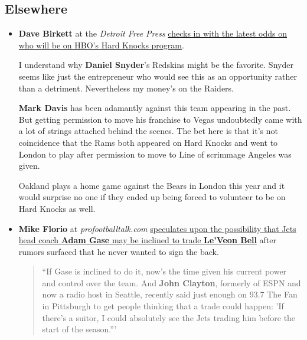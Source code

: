 \documentclass[11pt]{article}
\begin{document}
\subsection{Elsewhere}
\begin{itemize}
\item \textbf{Dave Birkett} at the \emph{Detroit Free Press} \href{https://twitter.com/davebirkett/status/1130120949548949504?s=12}{checks in with the latest odds on who will be on HBO's Hard Knocks program}.

\begin{tabular}{ll}
  \multicolumn{2}{l}{\textbf{Hard Knocks 2019 - Team Featured}
  Washington Redskins &5/4\\
  Oakland Raiders &5/2\\
  New York Giants &3/1\\
  Detroit Lions &7/2\\
  San Francisco 49ers &9/1\\ 
\end{tabular}

I understand why \textbf{Daniel Snyder}'s Redskins might be the favorite.  Snyder seems like just the entrepreneur who would see this as an opportunity rather than a detriment.  Nevertheless my money's on the Raiders.

\textbf{Mark Davis} has been adamantly against this team appearing in the past.  But getting permission to move his franchise to Vegas undoubtedly came with a lot of strings attached behind the scenes.  The bet here is that it's not coincidence that the Rams both appeared on Hard Knocks and went to London to play after permission to move to Line of scrimmage Angeles was given.

Oakland plays a home game against the Bears in London this year and it would surprise no one if they ended up being forced to volunteer to be on Hard Knocks as well.

\item \textbf{Mike Florio} at \textit{profootballtalk.com} \href{https://profootballtalk.nbcsports.com/2019/05/19/would-jets-trade-leveon-bell/}{speculates upon the possibility that Jets head coach \textbf{Adam Gase} may be inclined to trade \textbf{Le'Veon Bell}} after rumors surfaced that he never wanted to sign the back.

\begin{quote}
``If Gase is inclined to do it, now’s the time given his current power and control over the team. And \textbf{John Clayton}, formerly of ESPN and now a radio host in Seattle, recently said just enough on 93.7 The Fan in Pittsburgh to get people thinking that a trade could happen: 'If there’s a suitor, I could absolutely see the Jets trading him before the start of the season.'''
\end{quote}


\end{itemize}
\end{document}
